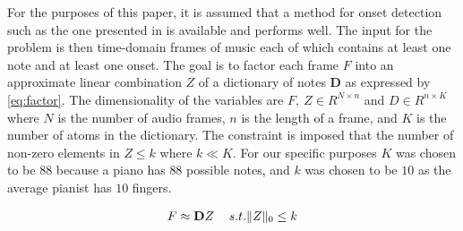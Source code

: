 For the purposes of this paper, it is assumed that a method for onset detection such as the one presented in \cite{bock_evaluating_nodate} is available and performs well.  The input for the problem is then time-domain frames of music each of which contains at least one note and at least one onset. The goal is to factor each frame $F$ into an approximate linear combination $Z$ of a dictionary of notes $\mathbf{D}$ as expressed by \eqref{eq:factor}. The dimensionality of the variables are $F,\ Z \in R^{N\times n}$ and $D\in R^{n\times K}$ where $N$ is the number of audio frames, $n$ is the length of a frame, and $K$ is the number of atoms in the dictionary. The constraint is imposed that the number of non-zero elements in $Z \le k$ where $k \ll K$. For our specific purposes $K$ was chosen to be $88$ because a piano has $88$ possible notes, and $k$ was chosen to be $10$ as the average pianist has $10$ fingers.

\begin{equation}
\begin{tabular}{cr}
	$F \approx \mathbf{D}Z$ & $s.t. \|Z\|_0 \le k$
\end{tabular}
\label{eq:factor}
\end{equation}
